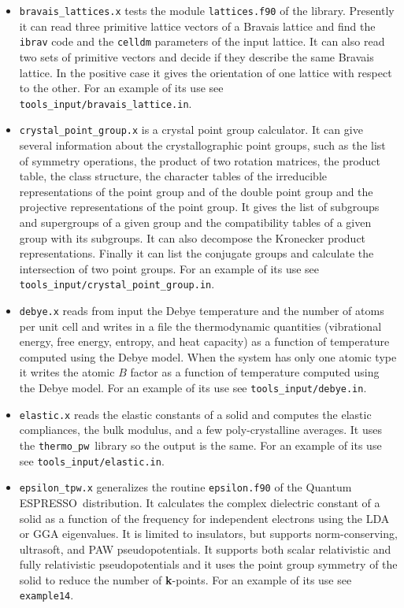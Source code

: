 \documentclass[12pt,a4paper]{article}
\def\qe{{\sc Quantum ESPRESSO}}
\def\thermo{\texttt{thermo\_pw}}
\begin{document}
\begin{itemize}

\item \texttt{bravais\_lattices.x} tests the
module \texttt{lattices.f90} of the library. Presently it can read three
primitive lattice vectors of a Bravais lattice and find the \texttt{ibrav}
code and the \texttt{celldm} parameters of the input lattice. It
can also read two sets of primitive vectors and decide if they describe
the same Bravais lattice. In the positive case it gives the orientation
of one lattice with respect to the other.
For an example of its use see \texttt{tools\_input/bravais\_lattice.in}.

\item \texttt{crystal\_point\_group.x} is a crystal point group calculator.
It can give several information about the crystallographic point groups,
such as the list of symmetry operations, the product of two rotation
matrices, the product table, the class structure, the character tables of 
the irreducible representations of the point group and of the double
point group and the projective representations of the point group. It
gives the list of subgroups and supergroups of a given group and 
the compatibility tables of a given group with its subgroups. It can 
also decompose the Kronecker product representations. Finally it
can list the conjugate groups and calculate the intersection of two
point groups.
For an example of its use see \texttt{tools\_input/crystal\_point\_group.in}.

\item \texttt{debye.x} reads from input the Debye temperature and the
number of atoms per unit cell and writes in a file the thermodynamic
quantities (vibrational energy, free energy, entropy, and heat capacity) as
a function of temperature computed using the Debye model. When the
system has only one atomic type it writes the atomic $B$ factor
as a function of temperature computed using the Debye model.
For an example of its use see \texttt{tools\_input/debye.in}.

\item \texttt{elastic.x} reads the elastic constants of a
solid and computes the elastic compliances, the bulk modulus, and a few
poly-crystalline averages. It uses the \thermo\ library so the output is the
same. 
For an example of its use see \texttt{tools\_input/elastic.in}.

\item \texttt{epsilon\_tpw.x} generalizes the routine
\texttt{epsilon.f90} of the \qe\ distribution. It calculates the 
complex dielectric
constant of a solid as a function of the frequency for independent electrons
using the LDA or GGA eigenvalues. It is limited to insulators, but supports
norm-conserving, ultrasoft, and PAW pseudopotentials. It supports both scalar
relativistic and fully relativistic pseudopotentials and it uses the point
group symmetry of the solid to reduce the number of {\bf k}-points.
For an example of its use see \texttt{example14}.


\end{itemize}
\end{document}
